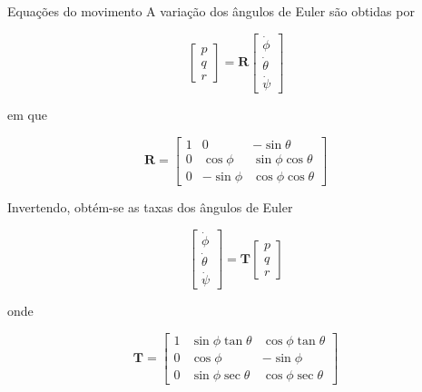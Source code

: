 \documentclass{beamer}
\newcommand{\jindent}{\justifying\setlength{\parindent}{1.5em}}
\begin{document}
\begin{frame}{Equações do movimento}
    \jindent
    A variação dos ângulos de Euler são obtidas  por

    \begin{equation*}
        \begin{bmatrix}
            p \\q \\r
        \end{bmatrix}
            = \mathbf R
        \begin{bmatrix}
            \dot{\phi} \\
            \dot{\theta} \\
            \dot{\psi}
        \end{bmatrix}
    \end{equation*}

    \justifying
    em que

    \begin{equation*}
        \mathbf R =
        \begin{bmatrix}
            1 & 0 & -\sin\theta \\
            0 & \cos\phi & \sin\phi \cos\theta \\
            0 & -\sin\phi & \cos\phi \cos\theta
        \end{bmatrix}
    \end{equation*}

    \jindent
    Invertendo, obtém-se as taxas dos ângulos de Euler

    \begin{equation*}
        \begin{bmatrix}
            \dot{\phi} \\
            \dot{\theta} \\
            \dot{\psi}
        \end{bmatrix}
         = \mathbf T
        \begin{bmatrix}
            p \\q \\r
        \end{bmatrix}
    \end{equation*}

    \justifying
    onde

    \begin{equation*}
        \mathbf T =
        \begin{bmatrix}
            1 & \sin\phi \tan\theta & \cos\phi \tan\theta \\
            0 & \cos\phi & -\sin\phi \\
            0 & \sin\phi \sec\theta & \cos\phi \sec\theta
        \end{bmatrix}
    \end{equation*}

\end{frame}
\end{document}
